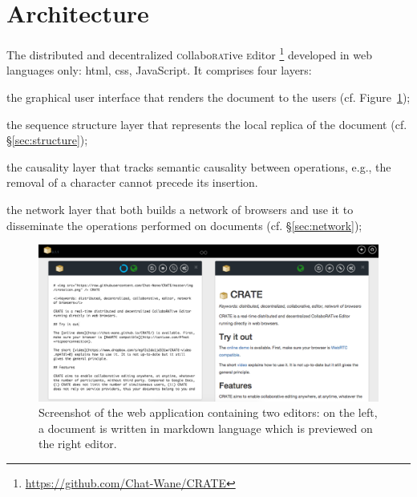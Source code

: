 
\section{Architecture}
\label{sec:architecture}

The distributed and decentralized \textsc{c}ollabo\textsc{rat}ive
\textsc{e}ditor \CRATE\footnote{\url{https://github.com/Chat-Wane/CRATE}}
developed in web languages only: html, css, JavaScript. It comprises four
layers:
\begin{inparaenum}[(i)]
\item the graphical user interface that renders the document to the users
  (cf. Figure~\ref{img:screenshot});
\item the sequence structure layer that represents the local replica of the
  document (cf. §\ref{sec:structure});
\item the causality layer that tracks semantic causality between operations,
  e.g., the removal of a character cannot precede its insertion.
\item the network layer that both builds a network of browsers and use it to
  disseminate the operations performed on documents (cf. §\ref{sec:network});
\end{inparaenum}

\begin{figure}
  \includegraphics[width=\textwidth]{./img/screenshot.png}
  \caption{\label{img:screenshot} Screenshot of the web application containing
    two editors: on the left, a document is written in markdown language which
    is previewed on the right editor.}
\end{figure}


